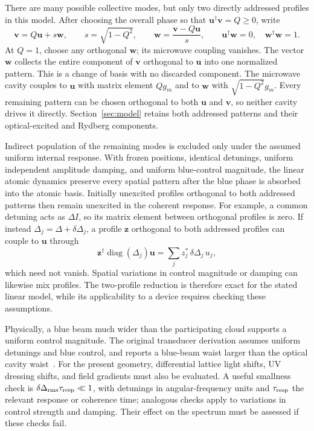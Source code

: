 \documentclass[aps,pra,onecolumn,10pt,letterpaper,notitlepage,nofootinbib,amsmath,amssymb]{revtex4-2}
\begin{document}
There are many possible collective modes, but only two directly addressed
profiles in this model. After choosing the overall phase so that
$\mathbf u^\dagger\mathbf v=Q\geq0$, write
\begin{equation}
 \mathbf v=Q\mathbf u+s\mathbf w,\qquad s=\sqrt{1-Q^2},\qquad
 \mathbf w=\frac{\mathbf v-Q\mathbf u}{s},\qquad
 \mathbf u^\dagger\mathbf w=0,\quad\mathbf w^\dagger\mathbf w=1.
 \label{eq:profile-decomposition}
\end{equation}
At $Q=1$, choose any orthogonal $\mathbf w$; its microwave coupling vanishes.
The vector $\mathbf w$ collects the entire component of $\mathbf v$ orthogonal
to $\mathbf u$ into one normalized pattern. This is a change of basis with no
discarded component. The microwave cavity couples to $\mathbf u$ with matrix
element $Qg_m$ and to $\mathbf w$ with $\sqrt{1-Q^2}g_m$. Every remaining pattern
can be chosen orthogonal to both $\mathbf u$ and $\mathbf v$, so neither cavity
drives it directly. Section~\ref{sec:model} retains both addressed patterns and
their optical-excited and Rydberg components.

Indirect population of the remaining modes is excluded only under the assumed
uniform internal response. With frozen positions, identical detunings, uniform
independent amplitude damping, and uniform blue-control magnitude, the linear
atomic dynamics preserve every spatial pattern after the blue phase is absorbed
into the atomic basis. Initially unexcited profiles orthogonal to both addressed
patterns then remain unexcited in the coherent response.
For example, a common detuning acts as $\Delta I$, so its
matrix element between orthogonal profiles is zero. If instead
$\Delta_j=\Delta+\delta\Delta_j$, a profile $\mathbf z$ orthogonal to both
addressed profiles can couple to $\mathbf u$ through
\begin{equation}
 \mathbf z^\dagger\operatorname{diag}(\Delta_j)\mathbf u
 =\sum_j z_j^*\,\delta\Delta_j\,u_j,
 \label{eq:inhomogeneous-mixing}
\end{equation}
which need not vanish. Spatial variations in control magnitude or damping can
likewise mix profiles. The two-profile reduction is therefore exact for the
stated linear model, while its applicability to a device requires checking
these assumptions.

Physically, a blue beam much wider than the participating cloud supports a
uniform control magnitude. The original transducer derivation assumes uniform
detunings and blue control, and reports a blue-beam waist larger than the optical
cavity waist~\cite{kumarSI}. For the present geometry, differential lattice light
shifts, UV dressing shifts, and field gradients must also be evaluated.
A useful smallness check is $\delta\Delta_{\rm rms}\tau_{\rm resp}\ll1$, with
detunings in angular-frequency units and $\tau_{\rm resp}$ the relevant response
or coherence time; analogous checks apply to variations in control strength and
damping. Their effect on the spectrum must be assessed if these checks fail.
\end{document}
